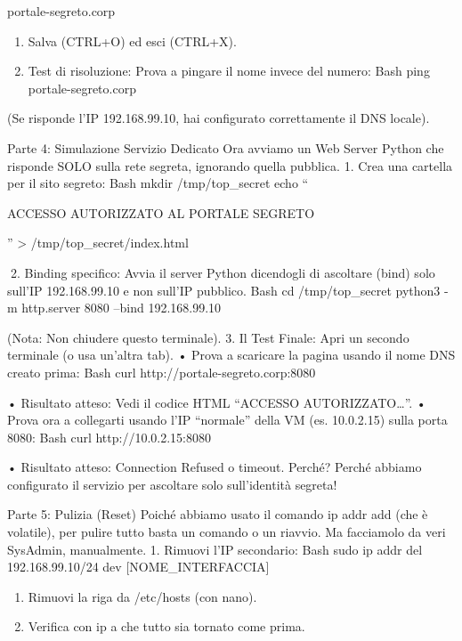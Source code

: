 \documentclass[11pt,a4paper]{article}
\providecommand{\tightlist}{%
  \setlength{\itemsep}{0pt}\setlength{\parskip}{0pt}}
\begin{document}
portale-segreto.corp

\begin{enumerate}
\def\labelenumi{\arabic{enumi}.}
\setcounter{enumi}{2}
\tightlist
\item
  Salva (CTRL+O) ed esci (CTRL+X).
\item
  Test di risoluzione: Prova a pingare il nome invece del numero: Bash
  ping portale-segreto.corp
\end{enumerate}

(Se risponde l'IP 192.168.99.10, hai configurato correttamente il DNS
locale).

Parte 4: Simulazione Servizio Dedicato Ora avviamo un Web Server Python
che risponde SOLO sulla rete segreta, ignorando quella pubblica. 1. Crea
una cartella per il sito segreto: Bash mkdir /tmp/top\_secret echo ``

ACCESSO AUTORIZZATO AL PORTALE SEGRETO

'' \textgreater{} /tmp/top\_secret/index.html

2. Binding specifico: Avvia il server Python dicendogli di ascoltare
(bind) solo sull'IP 192.168.99.10 e non sull'IP pubblico. Bash cd
/tmp/top\_secret python3 -m http.server 8080 --bind 192.168.99.10

(Nota: Non chiudere questo terminale). 3. Il Test Finale: Apri un
secondo terminale (o usa un'altra tab). • Prova a scaricare la pagina
usando il nome DNS creato prima: Bash curl
http://portale-segreto.corp:8080

• Risultato atteso: Vedi il codice HTML ``ACCESSO AUTORIZZATO\ldots{}''.
• Prova ora a collegarti usando l'IP ``normale'' della VM (es.
10.0.2.15) sulla porta 8080: Bash curl http://10.0.2.15:8080

• Risultato atteso: Connection Refused o timeout. Perché? Perché abbiamo
configurato il servizio per ascoltare solo sull'identità segreta!

Parte 5: Pulizia (Reset) Poiché abbiamo usato il comando ip addr add
(che è volatile), per pulire tutto basta un comando o un riavvio. Ma
facciamolo da veri SysAdmin, manualmente. 1. Rimuovi l'IP secondario:
Bash sudo ip addr del 192.168.99.10/24 dev {[}NOME\_INTERFACCIA{]}

\begin{enumerate}
\def\labelenumi{\arabic{enumi}.}
\setcounter{enumi}{1}
\tightlist
\item
  Rimuovi la riga da /etc/hosts (con nano).
\item
  Verifica con ip a che tutto sia tornato come prima.
\end{enumerate}
\end{document}
